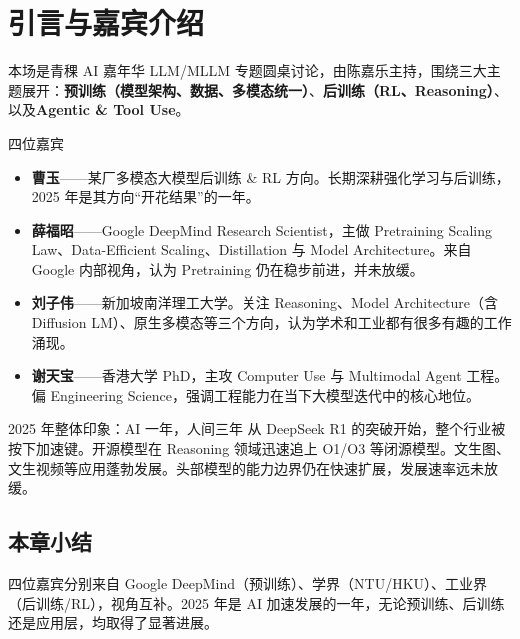\section{引言与嘉宾介绍}

本场是青稞 AI 嘉年华 LLM/MLLM 专题圆桌讨论，由陈嘉乐主持，围绕三大主题展开：\textbf{预训练（模型架构、数据、多模态统一）}、\textbf{后训练（RL、Reasoning）}、以及\textbf{Agentic \& Tool Use}。

\begin{knowledgebox}{四位嘉宾}
\begin{itemize}
  \item \textbf{曹玉}——某厂多模态大模型后训练 \& RL 方向。长期深耕强化学习与后训练，2025 年是其方向``开花结果''的一年。
  \item \textbf{薛福昭}——Google DeepMind Research Scientist，主做 Pretraining Scaling Law、Data-Efficient Scaling、Distillation 与 Model Architecture。来自 Google 内部视角，认为 Pretraining 仍在稳步前进，并未放缓。
  \item \textbf{刘子伟}——新加坡南洋理工大学。关注 Reasoning、Model Architecture（含 Diffusion LM）、原生多模态等三个方向，认为学术和工业都有很多有趣的工作涌现。
  \item \textbf{谢天宝}——香港大学 PhD，主攻 Computer Use 与 Multimodal Agent 工程。偏 Engineering Science，强调工程能力在当下大模型迭代中的核心地位。
\end{itemize}
\end{knowledgebox}

\begin{importantbox}{2025 年整体印象：AI 一年，人间三年}
从 DeepSeek R1 的突破开始，整个行业被按下加速键。开源模型在 Reasoning 领域迅速追上 O1/O3 等闭源模型。文生图、文生视频等应用蓬勃发展。头部模型的能力边界仍在快速扩展，发展速率远未放缓。
\end{importantbox}

\subsection{本章小结}
四位嘉宾分别来自 Google DeepMind（预训练）、学界（NTU/HKU）、工业界（后训练/RL），视角互补。2025 年是 AI 加速发展的一年，无论预训练、后训练还是应用层，均取得了显著进展。

